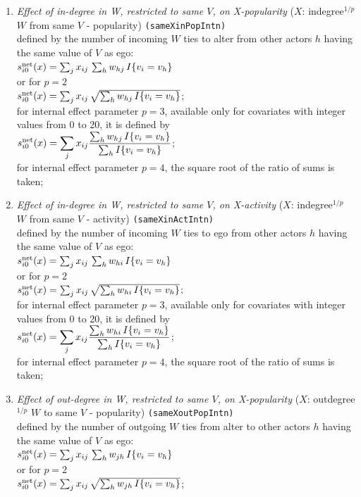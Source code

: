 \documentclass[a4paper,fleqn,11pt]{article}
\newcommand{\+}{\, + \,}
\newcommand{\vit}{\theenumi}
\newcounter{savenumi}
\begin{document}
\begin{enumerate}
\setcounter{enumi}{\value{savenumi}}
 \item {\em Effect of in-degree in W, restricted to same $V$, on X-popularity }
 ($X$: indegree$^{1/p}$ $W$ from same $V$ - popularity)   \texttt{(sameXinPopIntn)}\\
 defined by the number of incoming $W$ ties to alter from other actors $h$
 having the same value of $V$ as ego:\\
 $s^{\rm net}_{i\vit}(x) =  \sum_j x_{ij}\, \sum_h w_{hj}\,I\{v_i = v_h\}  $ \\
 or for $p=2$ \\
   $s^{\rm net}_{i\vit}(x) =  \sum_j x_{ij}\, \sqrt{\sum_h w_{hj}\,I\{v_i = v_h\}}   $;\\
 for internal effect parameter $p=3$, available only for
 covariates with integer values from 0 to 20, it is defined by\\
 $\displaystyle s^{\rm net}_{i\vit}(x) = \sum_j x_{ij} \frac{\sum_h w_{hj}\, I\{v_i = v_h \}}
                {\sum_h I\{v_i = v_h \}} $;\\
 for internal effect parameter $p=4$, the square root of the ratio of sums is taken;

 \item {\em Effect of in-degree in W, restricted to same $V$, on X-activity }
 ($X$: indegree$^{1/p}$ $W$ from same $V$ - activity) \texttt{(sameXinActIntn)}\\
 defined by the number of incoming $W$ ties to ego from other actors $h$
 having the same value of $V$ as ego:\\
 $s^{\rm net}_{i\vit}(x) =  \sum_j x_{ij}\, \sum_h w_{hi}\,I\{v_i = v_h\}  $ \\
 or for $p=2$ \\
   $s^{\rm net}_{i\vit}(x) =  \sum_j x_{ij}\, \sqrt{\sum_h w_{hi}\,I\{v_i = v_h\}}   $;\\
 for internal effect parameter $p=3$, available only for
 covariates with integer values from 0 to 20, it is defined by\\
 $\displaystyle s^{\rm net}_{i\vit}(x) = \sum_j x_{ij} \frac{\sum_h w_{hi}\, I\{v_i = v_h \}}
                {\sum_h I\{v_i = v_h \}} $;\\
 for internal effect parameter $p=4$, the square root of the ratio of sums is taken;


 \item {\em Effect of out-degree in W, restricted to same $V$, on X-popularity }
 ($X$: outdegree$^{1/p}$ $W$ to same $V$ - popularity)   \texttt{(sameXoutPopIntn)}\\
 defined by the number of outgoing $W$ ties from alter to other actors $h$
 having the same value of $V$ as ego:\\
 $s^{\rm net}_{i\vit}(x) =  \sum_j x_{ij}\, \sum_h w_{jh}\,I\{v_i = v_h\}  $ \\
 or for $p=2$ \\
   $s^{\rm net}_{i\vit}(x) =  \sum_j x_{ij}\, \sqrt{\sum_h w_{jh}\,I\{v_i = v_h\}}   $;


\end{enumerate}
\end{document}
